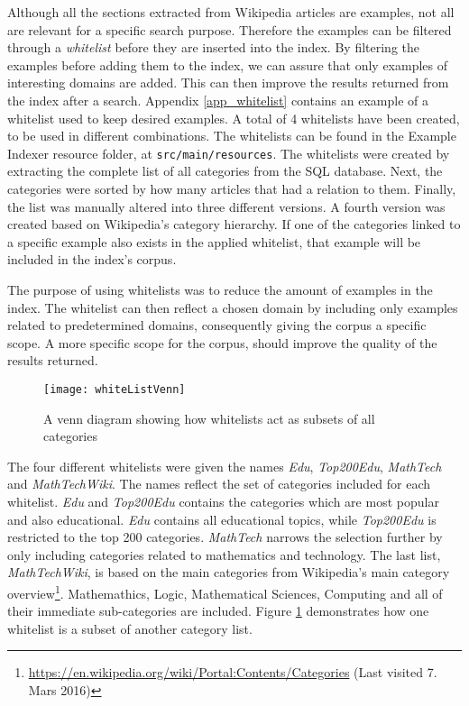 Although all the sections extracted from Wikipedia articles are examples, not all are relevant for a specific search purpose. Therefore the examples can be filtered through a \textit{whitelist} before they are inserted into the index. By filtering the examples before adding them to the index, we can assure that only examples of interesting domains are added. This can then improve the results returned from the index after a search. Appendix \ref{app_whitelist} contains an example of a whitelist used to keep desired examples. A total of 4 whitelists have been created, to be used in different combinations. The whitelists can be found in the Example Indexer resource folder, at \texttt{src/main/resources}. The whitelists were created by extracting the complete list of all categories from the SQL database. Next, the categories were sorted by how many articles that had a relation to them. Finally, the list was manually altered into three different versions. A fourth version was created based on Wikipedia's category hierarchy. If one of the categories linked to a specific example also exists in the applied whitelist, that example will be included in the index's corpus.

The purpose of using whitelists was to reduce the amount of examples in the index. The whitelist can then reflect a chosen domain by including only examples related to predetermined domains, consequently giving the corpus a specific scope. A more specific scope for the corpus, should improve the quality of the results returned. 

\begin{figure}[h] 
\caption{A venn diagram showing how whitelists act as subsets of all categories}
\texttt{[image: whiteListVenn]}
\label{fig:whiteListVenn}
\end{figure}
The four different whitelists were given the names \textit{Edu}, \textit{Top200Edu}, \textit{MathTech} and \textit{MathTechWiki}. The names reflect the set of categories included for each whitelist. \textit{Edu} and \textit{Top200Edu} contains the categories which are most popular and also educational. \textit{Edu} contains all educational topics, while \textit{Top200Edu} is restricted to the top 200 categories. \textit{MathTech} narrows the selection further by only including categories related to mathematics and technology. The last list, \textit{MathTechWiki}, is based on the main categories from Wikipedia's main category overview\footnote{\url{https://en.wikipedia.org/wiki/Portal:Contents/Categories} (Last visited 7. Mars 2016)}. Mathemathics, Logic, Mathematical Sciences, Computing and all of their immediate sub-categories are included. Figure \ref{fig:whiteListVenn} demonstrates how one whitelist is a subset of another category list. 

